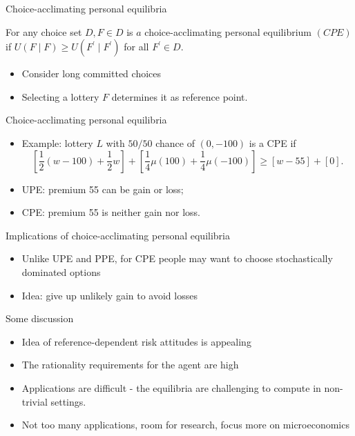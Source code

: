\begin{frame}{Choice-acclimating personal equilibria}

    \begin{definition}[CPE]
        For any choice set $D, F \in D$ is $a$ choice-acclimating personal equilibrium $(C P E)$
        if $U(F \mid F) \geq U\left(F^{\prime} \mid F^{\prime}\right)$ for all $F^{\prime} \in D$.
    \end{definition}\bigskip
     \begin{itemize}
        \item Consider long committed choices\medskip
        \item  Selecting a lottery $F$ determines it as reference point.\medskip
	\end{itemize}
\end{frame}

\begin{frame}{Choice-acclimating personal equilibria}
     \begin{itemize}
           \item Example: lottery $L$ with $50/50$ chance of $(0,-100)$ is a CPE if
  \[
    \left[\frac{1}{2}(w-100)+\frac{1}{2} w\right]
   +\left[\frac{1}{4} \mu(100)+\frac{1}{4} \mu(-100)\right]
     \geq[w-55]+[0] .
\]
        \item UPE: premium 55 can be gain or loss;\medskip
        \item CPE: premium 55 is neither gain nor loss.\medskip
	\end{itemize}
\end{frame}

\begin{frame}{Implications of choice-acclimating personal equilibria}
    \begin{itemize}
        \item Unlike UPE and PPE, for CPE people may want to choose stochastically dominated options\medskip
        \item Idea: give up unlikely gain to avoid losses\medskip
	\end{itemize}
\end{frame}



\begin{frame}{Some discussion}
    \begin{itemize}
        \item Idea of reference-dependent risk attitudes is appealing\medskip
        \item The rationality requirements for the agent are high\medskip
        \item Applications are difficult - the equilibria are challenging to compute in non-trivial settings.\medskip
        \item Not too many applications, room for research, focus more on microeconomics\medskip
	\end{itemize}
\end{frame}


